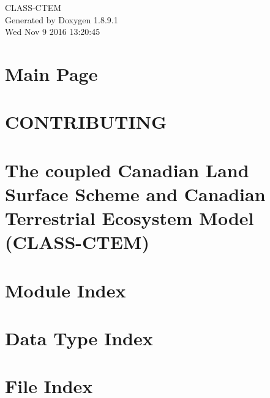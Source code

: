 \documentclass[twoside]{book}
\newcommand{\+}{\discretionary{\mbox{\scriptsize$\hookleftarrow$}}{}{}}
\newcommand{\clearemptydoublepage}{%
  \newpage{\pagestyle{empty}\cleardoublepage}%
}
\begin{document}
\hypersetup{pageanchor=false,
             bookmarks=true,
             bookmarksnumbered=true,
             pdfencoding=unicode
            }
\begin{titlepage}
\vspace*{7cm}
\begin{center}%
{\Large C\+L\+A\+S\+S-\/\+C\+T\+E\+M }\\
\vspace*{1cm}
{\large Generated by Doxygen 1.8.9.1}\\
\vspace*{0.5cm}
{\small Wed Nov 9 2016 13:20:45}\\
\end{center}
\end{titlepage}
\clearemptydoublepage
\tableofcontents
\clearemptydoublepage
{}
\hypersetup{pageanchor=true}

\chapter{Main Page}
\label{index}\hypertarget{index}{}
\chapter{C\+O\+N\+T\+R\+I\+B\+U\+T\+I\+N\+G}
\label{md_CONTRIBUTING}
\hypertarget{md_CONTRIBUTING}{}

\chapter{The coupled Canadian Land Surface Scheme and Canadian Terrestrial Ecosystem Model (C\+L\+A\+S\+S-\/\+C\+T\+E\+M)}
\label{md_README}
\hypertarget{md_README}{}

\chapter{Module Index}

\chapter{Data Type Index}

\chapter{File Index}

\end{document}
